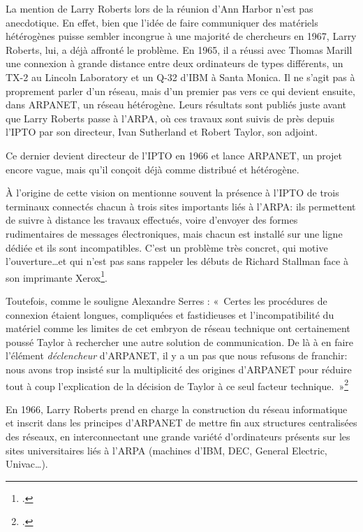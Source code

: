 \documentclass{FramateX}
\begin{document}
\begin{refsection}
La mention de Larry Roberts lors de la réunion d'Ann
Harbor n'est pas anecdotique. En effet, bien que
l'idée de faire communiquer des matériels hétérogènes
puisse sembler incongrue à une majorité de chercheurs en 1967, Larry
Roberts, lui, a déjà affronté le problème. En 1965, il a réussi avec
Thomas Marill une connexion à grande distance entre deux ordinateurs de
types différents, un TX-2 au Lincoln Laboratory et un Q-32
d'IBM à Santa Monica. Il ne s'agit
pas à proprement parler d'un réseau, mais
d'un premier pas vers ce qui devient ensuite, dans
ARPANET, un réseau hétérogène. Leurs résultats sont
publiés juste avant que Larry Roberts passe à l'ARPA,
où ces travaux sont suivis de près depuis l'IPTO par
son directeur, Ivan Sutherland et Robert Taylor, son adjoint. 

Ce dernier devient directeur de l'IPTO en 1966 et lance
ARPANET, un projet encore vague, mais qu'il conçoit
déjà comme distribué et hétérogène. 

À l'origine de cette vision on mentionne souvent la
présence à l'IPTO de trois terminaux connectés chacun
à trois sites importants liés à l'ARPA: ils
permettent de suivre à distance les travaux effectués, voire
d'envoyer des formes rudimentaires de messages
électroniques, mais chacun est installé sur une ligne dédiée et ils
sont incompatibles. C'est un problème très concret,
qui motive l'ouverture\ldots et qui
n'est pas sans rappeler les débuts de Richard Stallman
face à son imprimante Xerox\footnote{\cite[chap.~1]{williamsrichard2010}.}.


Toutefois, comme le souligne Alexandre Serres : «~Certes les procédures
de connexion étaient longues, compliquées et fastidieuses et
l'incompatibilité du matériel comme les limites de cet
embryon de réseau technique ont certainement poussé Taylor à rechercher
une autre solution de communication. De là à en faire
l'élément  \textit{déclencheur} d'ARPANET, il y a un pas que nous refusons de franchir: nous avons trop insisté sur la multiplicité des origines d'ARPANET pour réduire tout à coup
l'explication de la décision de Taylor à ce seul
facteur technique.~»\footnote{\cite[p.~397]{serresaux2000}.}

En 1966, Larry Roberts prend en charge la construction du réseau
informatique et inscrit dans les principes d'ARPANET
de mettre fin aux structures centralisées des réseaux, en
interconnectant une grande variété d'ordinateurs
présents sur les sites universitaires liés à l'ARPA
(machines d'IBM, DEC, General Electric, Univac\ldots). 


\end{refsection}
\end{document}

